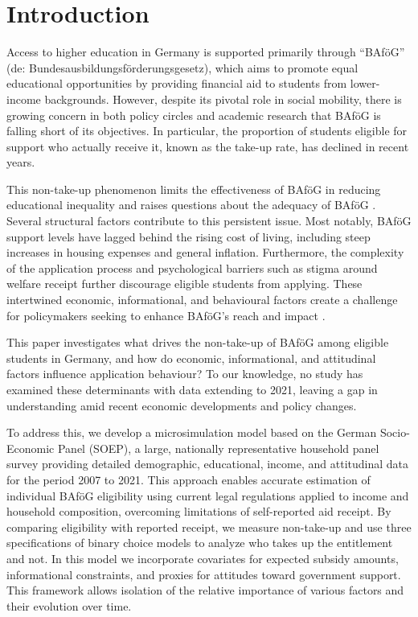 \section{Introduction} \label{sec:intro}


Access to higher education in Germany is supported primarily through ``BAföG'' (de: Bundesausbildungsförderungsgesetz), which aims to promote equal educational opportunities by providing financial aid to students from lower-income backgrounds. 
However, despite its pivotal role in social mobility, there is growing concern in both policy circles and academic research that BAföG is falling short of its objectives. 
In particular, the proportion of students eligible for support who actually receive it, known as the take-up rate, has declined in recent years. 

This non-take-up phenomenon limits the effectiveness of BAföG in reducing educational inequality and raises questions about the adequacy of BAföG \citep{gwosc_krisenbewaltigung_2022, meier_bafog_2024}. 
Several structural factors contribute to this persistent issue. 
Most notably, BAföG support levels have lagged behind the rising cost of living, including steep increases in housing expenses and general inflation.
Furthermore, the complexity of the application process and psychological barriers such as stigma around welfare receipt further discourage eligible students from applying. 
These intertwined economic, informational, and behavioural factors create a challenge for policymakers seeking to enhance BAföG’s reach and impact \citep{meier_bafog_2024, staack_von_2017}.

This paper investigates what drives the non-take-up of BAföG among eligible students in Germany, and how do economic, informational, and attitudinal factors influence application behaviour? 
To our knowledge, no study has examined these determinants with data extending to 2021, leaving a gap in understanding amid recent economic developments and policy changes.

To address this, we develop a microsimulation model based on the German Socio-Economic Panel (SOEP), a large, nationally representative household panel survey providing detailed demographic, educational, income, and attitudinal data for the period 2007 to 2021.
This approach enables accurate estimation of individual BAföG eligibility using current legal regulations applied to income and household composition, overcoming limitations of self-reported aid receipt. 
By comparing eligibility with reported receipt, we measure non-take-up and use three specifications of binary choice models to analyze who takes up the entitlement and not. 
In this model we incorporate covariates for expected subsidy amounts, informational constraints, and proxies for attitudes toward government support. 
This framework allows isolation of the relative importance of various factors and their evolution over time.

